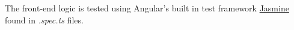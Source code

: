 \begin{figure}[H]
\hfill
\end{figure}

The front-end logic is tested using Angular's built in test framework \href{https://jasmine.github.io/}{Jasmine} found in \textit{.spec.ts} files.

